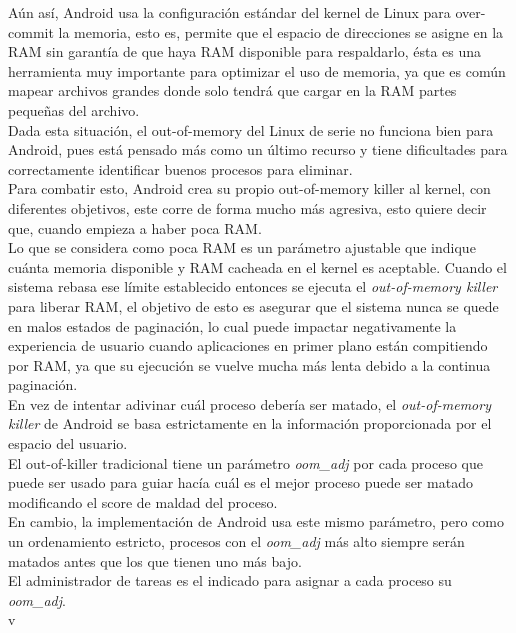 \documentclass[a4paper]{article}
\begin{document}
Aún así, Android usa la configuración estándar del kernel de Linux para over-commit la memoria, esto es, permite que el espacio de direcciones se asigne en la RAM sin garantía de que haya RAM disponible para respaldarlo, ésta es una herramienta muy importante para optimizar el uso de memoria, ya que es común mapear archivos grandes donde solo tendrá que cargar en la RAM partes pequeñas del archivo.\\

Dada esta situación, el out-of-memory del Linux de serie no funciona bien para Android, pues está pensado más como un último recurso y tiene dificultades para correctamente identificar buenos procesos para eliminar.\\

Para combatir esto, Android crea su propio out-of-memory killer al kernel, con diferentes objetivos, este corre de forma mucho más agresiva, esto quiere decir que, cuando empieza a haber poca RAM.\\

Lo que se considera como poca RAM es un parámetro ajustable que indique cuánta memoria disponible y RAM cacheada en el kernel es aceptable. Cuando el sistema rebasa ese límite establecido entonces se ejecuta el \textit{out-of-memory killer} para liberar RAM, el objetivo de esto es asegurar que el sistema nunca se quede en malos estados de paginación, lo cual puede impactar negativamente la experiencia de usuario cuando aplicaciones en primer plano están compitiendo por RAM, ya que su ejecución se vuelve mucha más lenta debido a la continua paginación.\\

En vez de intentar adivinar cuál proceso debería ser matado, el \textit{out-of-memory killer} de Android se basa estrictamente en la información proporcionada por el espacio del usuario. \\
  
El out-of-killer tradicional tiene un parámetro \textit{oom\_adj} por cada proceso que puede ser usado para guiar hacía cuál es el mejor proceso puede ser matado modificando el score de maldad del proceso. \\ 
En cambio, la implementación de Android usa este mismo parámetro, pero como un ordenamiento estricto, procesos con el \textit{oom\_adj} más alto siempre serán matados antes que los que tienen uno más bajo. \\

El administrador de tareas es el indicado para asignar a cada proceso su \textit{oom\_adj}. \\v
\end{document}
